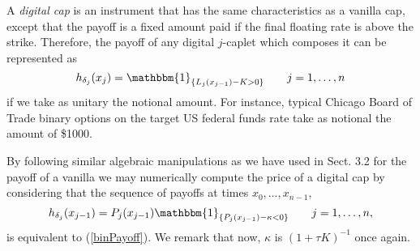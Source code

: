 A {\sl digital cap} is an instrument that has the same characteristics
as a vanilla cap, except that the payoff is a fixed amount paid if the
final floating rate is above the strike. Therefore, the payoff of any
digital $j$-caplet which composes it can be represented as
\begin{equation}
\label{binPayoff}
h_{\delta_j} (x_j) = \mathbbm{1}_{\{L_j(x_{j-1})-K>0 \}} \qquad j=1,\dots,n
\end{equation}
if we take as unitary the notional amount. For instance, typical
Chicago Board of Trade binary options on the target US federal funds
rate take as notional the amount of \$1000.   

By following similar algebraic manipulations as we have used in
Sect. 3.2 for the payoff of a vanilla we may numerically compute the
price of a digital cap by considering that the sequence of
payoffs at times $ x_0, \dots, x_{n-1}$,
\begin{equation}
h_{\delta_j} (x_{j-1}) = P_j(x_{j-1}) \mathbbm{1}_{ \{ P_j(x_{j-1}) -
  \kappa <0 \} } \qquad j=1,\dots,n, 
\end{equation}
is equivalent to (\ref{binPayoff}). We remark that now, $\kappa$ is
$(1+\tau K)^{-1}$ once again.

